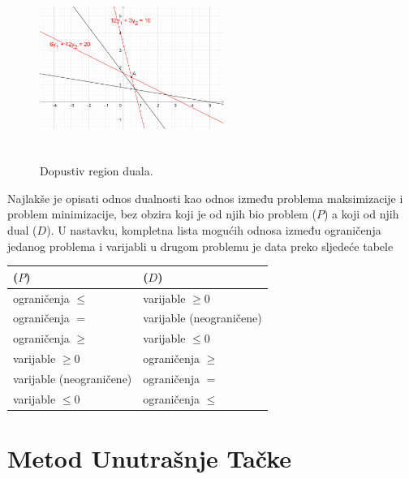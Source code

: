 \documentclass[a4paper, utf8, 11pt, colorlinks]{book}
\begin{document}
\begin{figure}[!ht]
    \centering
    \includegraphics[width=170pt, height=170pt]{fig6.eps}
    \caption{Dopustiv region duala.}
    \label{fig:fig6-dual-region}
\end{figure}

Najlakše je opisati odnos dualnosti kao odnos između problema maksimizacije i problem minimizacije, bez obzira 
koji je od njih bio problem ($P$) a koji od njih  dual ($D$). 
U nastavku, kompletna lista mogućih odnosa između ograničenja
jedanog problema i varijabli u drugom problemu je data preko sljedeće tabele
\begin{table}[!ht]
\begin{tabular}{l|l}
      ($P$) & ($D$) \\ \hline
      ograničenja $\leq$  & varijable $\geq 0$ \\
      ograničenja $=$     & varijable (neograničene) \\
      ograničenja $\geq$  & varijable $\leq 0$ \\
      varijable $\geq 0$    & ograničenja $\geq$ \\
      varijable (neograničene) & ograničenja $=$ \\
      varijable $\leq 0$         & ograničenja $\leq$ \\ \hline
 \end{tabular}

\end{table}


\section{Metod Unutrašnje Tačke}
\end{document}
